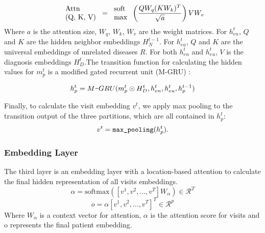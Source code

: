 \documentclass[11pt,a4paper,fleqn]{article}
\begin{document}
\begin{equation}
\begin{tabular}{l}
Attn \\ (Q, K, V) 
\end{tabular}
=
\begin{tabular}{l}
  soft \\
  max
\end{tabular}\left(\frac{QW_q(KW_k)^T}{\sqrt{a}}\right)VW_v 
\end{equation}
\normalsize
Where $a$ is the attention size, $W_q$, $W_k$, $W_v$ are the weight matrices.
For $h_{en}^t$, $Q$ and $K$ are the hidden neighbor embeddings $H_N^{t-1}$.
For $h_{eu}^t$, $Q$ and $K$ are the universal embeddings of unrelated diseases $R$.
For both $h_{en}^t$ and $h_{eu}^t$, $V$ is the diagnosis embeddings $H^{t}_D$.
​
The transition function for calculating the hidden values for $m_p^t$ is a modified 
gated recurrent unit (M-GRU) \cite{gru}:

\begin{equation}
  h_p^t = {M\verb|-|GRU}(m_p^t \odot H_D^t , h_{en}^t, h_{eu}^t, h_p^{t-1})
\end{equation}

Finally, to calculate the visit embedding $v^t$, we apply max pooling to the 
transition output of the three partitions, which are all contained in $h_p^t$:
\begin{equation}
  v^t = \verb|max_pooling|(h_p^t).
\end{equation}

\subsubsection{Embedding Layer}
The third layer is an embedding layer with a location-based attention to calculate the final hidden representation of all visits embeddings.
\begin{equation}
  \alpha=\textrm{softmax}([v^1,v^2,\dots, v^T]W_\alpha)\in \mathcal{R}^T
\end{equation}
\begin{equation}
  o=\alpha[v^1,v^2,\dots, v^T]^T\in\mathcal{R}^p
\end{equation}
Where $W_\alpha$ is a context vector for attention, $\alpha$ is the attention score for visits and o represents the final patient embedding.
\end{document}
